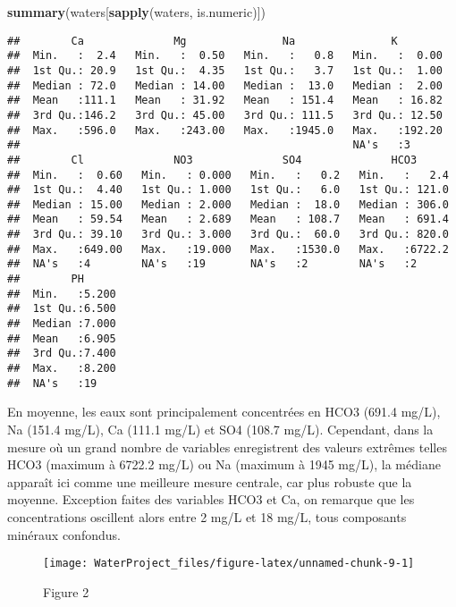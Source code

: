 \documentclass[]{article}
\newenvironment{Shaded}{\begin{snugshade}}{\end{snugshade}}
\newcommand{\KeywordTok}[1]{\textcolor[rgb]{0.13,0.29,0.53}{\textbf{#1}}}
\newcommand{\NormalTok}[1]{#1}
\begin{document}
\begin{Shaded}
\begin{Highlighting}[]
\KeywordTok{summary}\NormalTok{(waters[}\KeywordTok{sapply}\NormalTok{(waters, is.numeric)])}
\end{Highlighting}
\end{Shaded}

\begin{verbatim}
##        Ca              Mg               Na               K         
##  Min.   :  2.4   Min.   :  0.50   Min.   :   0.8   Min.   :  0.00  
##  1st Qu.: 20.9   1st Qu.:  4.35   1st Qu.:   3.7   1st Qu.:  1.00  
##  Median : 72.0   Median : 14.00   Median :  13.0   Median :  2.00  
##  Mean   :111.1   Mean   : 31.92   Mean   : 151.4   Mean   : 16.82  
##  3rd Qu.:146.2   3rd Qu.: 45.00   3rd Qu.: 111.5   3rd Qu.: 12.50  
##  Max.   :596.0   Max.   :243.00   Max.   :1945.0   Max.   :192.20  
##                                                    NA's   :3       
##        Cl              NO3              SO4              HCO3       
##  Min.   :  0.60   Min.   : 0.000   Min.   :   0.2   Min.   :   2.4  
##  1st Qu.:  4.40   1st Qu.: 1.000   1st Qu.:   6.0   1st Qu.: 121.0  
##  Median : 15.00   Median : 2.000   Median :  18.0   Median : 306.0  
##  Mean   : 59.54   Mean   : 2.689   Mean   : 108.7   Mean   : 691.4  
##  3rd Qu.: 39.10   3rd Qu.: 3.000   3rd Qu.:  60.0   3rd Qu.: 820.0  
##  Max.   :649.00   Max.   :19.000   Max.   :1530.0   Max.   :6722.2  
##  NA's   :4        NA's   :19       NA's   :2        NA's   :2       
##        PH       
##  Min.   :5.200  
##  1st Qu.:6.500  
##  Median :7.000  
##  Mean   :6.905  
##  3rd Qu.:7.400  
##  Max.   :8.200  
##  NA's   :19
\end{verbatim}

En moyenne, les eaux sont principalement concentrées en HCO3 (691.4
mg/L), Na (151.4 mg/L), Ca (111.1 mg/L) et SO4 (108.7 mg/L). Cependant,
dans la mesure où un grand nombre de variables enregistrent des valeurs
extrêmes telles HCO3 (maximum à 6722.2 mg/L) ou Na (maximum à 1945
mg/L), la médiane apparaît ici comme une meilleure mesure centrale, car
plus robuste que la moyenne. Exception faites des variables HCO3 et Ca,
on remarque que les concentrations oscillent alors entre 2 mg/L et 18
mg/L, tous composants minéraux confondus.

\begin{figure}

{\centering \texttt{[image: WaterProject\_files/figure-latex/unnamed-chunk-9-1]} 

}

\caption{Figure 2}\label{fig:unnamed-chunk-9}
\end{figure}
\end{document}
